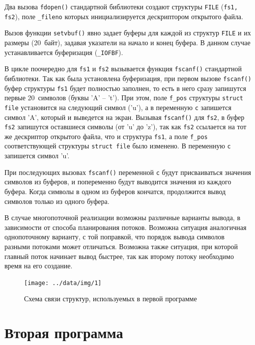 Два вызова \texttt{fdopen()} стандартной библиотеки создают структуры
\texttt{FILE} (\texttt{fs1, fs2}), поле \texttt{\_fileno} которых
инициализируется дескриптором открытого файла.

Вызов функции \texttt{setvbuf()} явно задает буферы для каждой из
структур \texttt{FILE} и их размеры (20~байт), задавая указатели на начало и конец буфера. В данном случае устанавливается буферизация (\texttt{\_IOFBF}).

В цикле поочередно для \texttt{fs1} и \texttt{fs2} вызывается функция
\texttt{fscanf()} стандартной библиотеки. Так как была установлена
буферизация, при первом вызове \texttt{fscanf()} буфер структуры \texttt{fs1}
будет полностью заполнен, то есть в него сразу запишутся первые 20~символов (буквы 'A' -- 't'). При этом, поле \texttt{f\_pos} структуры \texttt{struct file}
установится на следующий символ ('u'), а в переменную \texttt{c} запишется
символ 'A', который и выведется на экран. Вызывая \texttt{fscanf()} для
\texttt{fs2}, в буфер \texttt{fs2} запишутся оставшиеся символы (от 'u' до 'z'), так как
\texttt{fs2} ссылается на тот же дескриптор открытого файла, что и структура \texttt{fs1}, а
поле \texttt{f\_pos} соответствующей структуры \texttt{struct file} было
изменено. В переменную \texttt{c} запишется символ 'u'.

При последующих вызовах \texttt{fscanf()} переменной \texttt{c} будут
присваиваться значения символов из буферов, и попеременно будут выводится
значения из каждого буфера. Когда символы в одном из буферов кончатся,
продолжится вывод символов только из одного буфера.

В случае многопоточной реализации возможны различные варианты вывода, в
зависимости от способа планирования потоков. Возможна
ситуация аналогичная однопоточному варианту, с той поправкой, что порядок вывода
символов разными потоками может отличаться. Возможна также ситуация, при которой главный поток начинает вывод быстрее, так как второму потоку необходимо время на его создание.

\begin{figure}[ht]
	\centering
	\texttt{[image: ../data/img/1]}
	\caption{Схема связи структур, используемых в первой программе}
\end{figure}\newpage

\section{Вторая программа}

\captionsetup{singlelinecheck = false, justification=raggedright}



